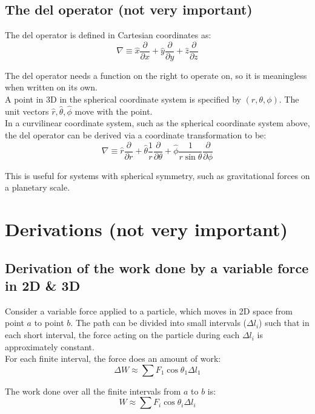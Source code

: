 \documentclass[11pt]{article}
\begin{document}
\subsection{The del operator (not very important)}
\label{sec:org6e61214}
The del operator is defined in Cartesian coordinates as:
\[\nabla \equiv \hat{x} \frac{\partial}{\partial x} + \hat{y} \frac{\partial}{\partial y} + \hat{z} \frac{\partial}{\partial z}\]

The del operator needs a function on the right to operate on, so it is meaningless when written on its own.
\\[0pt]

A point in 3D in the spherical coordinate system is specified by \((r, \theta, \phi)\). The unit vectors \(\hat{r}, \hat{\theta}, \hat{\phi}\) move with the point.
\\[0pt]

In a curvilinear coordinate system, such as the spherical coordinate system above, the del operator can be derived via a coordinate transformation to be:
\[\nabla \equiv \hat{r} \frac{\partial}{\partial r} + \hat{\theta} \frac{1}{r} \frac{\partial}{\partial \theta} + \hat{\phi} \frac{1}{r \sin \theta} \frac{\partial}{\partial \phi}\]

This is useful for systems with spherical symmetry, such as gravitational forces on a planetary scale.

\section{Derivations (not very important)}
\label{sec:org00653e5}

\subsection{Derivation of the work done by a variable force in 2D \& 3D}
\label{sec:org1ea8bb6}
Consider a variable force applied to a particle, which moves in 2D space from point \(a\) to point \(b\). The path can be divided into small intervals (\(\Delta l_i\)) such that in each short interval, the force acting on the particle during each \(\Delta l_i\) is approximately constant.
\\[0pt]

For each finite interval, the force does an amount of work:
\[\Delta W \approx \sum F_1 \cos \theta_1 \Delta l_1 \]

The work done over all the finite intervals from \(a\) to \(b\) is:
\[W \approx \sum F_i \cos \theta_i \Delta l_i\]
\end{document}
